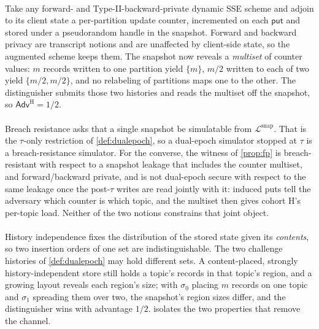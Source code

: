 \documentclass[10pt,journal,compsoc]{IEEEtran}
\newcommand{\AdvH}{\ensuremath{\mathsf{Adv}^{\mathrm{H}}}}
\begin{document}
\paragraph{} Take any forward- and Type-II-backward-private dynamic SSE scheme and
adjoin to its client state a per-partition update counter, incremented on each $\mathsf{put}$ and
stored under a pseudorandom handle in the snapshot. Forward and backward privacy are transcript
notions and are unaffected by client-side state, so the augmented scheme keeps them. The snapshot now
reveals a \emph{multiset} of counter values: $m$ records written to one partition yield $\{m\}$,
$m/2$ written to each of two yield $\{m/2,m/2\}$, and no relabeling of partitions maps one to the
other. The distinguisher submits those two histories and reads the multiset off the snapshot, so
$\AdvH = 1/2$.

\paragraph{} Breach resistance asks that a single snapshot be simulatable from
$\mathcal{L}^{\mathrm{snap}}$. That is the $\tau$-only restriction of \cref{def:dualepoch}, so a
dual-epoch simulator stopped at $\tau$ is a breach-resistance simulator. For the converse, the
witness of \cref{prop:fp} is breach-resistant with respect to a snapshot leakage that includes the
counter multiset, and forward/backward private, and is not dual-epoch secure with respect to the
same leakage once the post-$\tau$ writes are read jointly with it: induced puts tell the adversary
which counter is which topic, and the multiset then gives cohort H's per-topic load. Neither of the
two notions constrains that joint object.

\paragraph{} History independence fixes the distribution of the stored state given its
\emph{contents}, so two insertion orders of one set are indistinguishable. The two challenge
histories of \cref{def:dualepoch} may hold different sets. A content-placed, strongly
history-independent store still holds a topic's records in that topic's region, and a growing
layout reveals each region's size; with $\sigma_0$ placing $m$ records on one topic and $\sigma_1$
spreading them over two, the snapshot's region sizes differ, and the distinguisher wins with
advantage $1/2$.  isolates the two properties that remove the channel.
\end{document}
